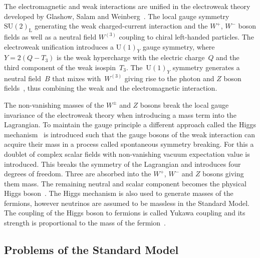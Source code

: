 The electromagnetic and weak interactions are unified in the electroweak theory
developed by Glashow, Salam and Weinberg~\cite{glashow, salam, weinberg}. The
local gauge symmetry~$\mathrm{SU}(2)_\text{L}$ generating the weak
charged-current interaction and the $W^+$, $W^-$ boson fields as well as a
neutral field $W^{(3)}$ coupling to chiral left-handed particles. The
electroweak unification introduces a $\mathrm{U}(1)_Y$ gauge symmetry,
where~$Y = 2 (Q - T_3)$ is the weak hypercharge with the electric charge~$Q$ and
the third component of the weak isospin~$T_3$. The~$\mathrm{U}(1)_Y$ symmetry
generates a neutral field~$B$ that mixes with~$W^{(3)}$ giving rise to the
photon and $Z$ boson fields~\cite{thomson}, thus combining the weak and the
electromagnetic interaction.

The non-vanishing masses of the $W^\pm$ and $Z$ bosons break the local gauge
invariance of the electroweak theory when introducing a mass term into the
Lagrangian. To maintain the gauge principle a different approach called the
Higgs mechanism~\cite{englert_brout, higgs} is introduced such that the gauge
bosons of the weak interaction can acquire their mass in a process called
spontaneous symmetry breaking. For this a doublet of complex scalar fields with
non-vanishing vacuum expectation value is introduced. This breaks the symmetry
of the Lagrangian and introduces four degrees of freedom. Three are absorbed
into the $W^+$, $W^-$ and $Z$ bosons giving them mass. The remaining neutral and
scalar component becomes the physical Higgs boson~\cite{thomson}. The Higgs
mechanism is also used to generate masses of the fermions, however neutrinos are
assumed to be massless in the Standard Model. The coupling of the Higgs boson to
fermions is called Yukawa coupling and its strength is proportional to the mass
of the fermion~\cite{thomson}.

\subsection{Problems of the Standard Model}

